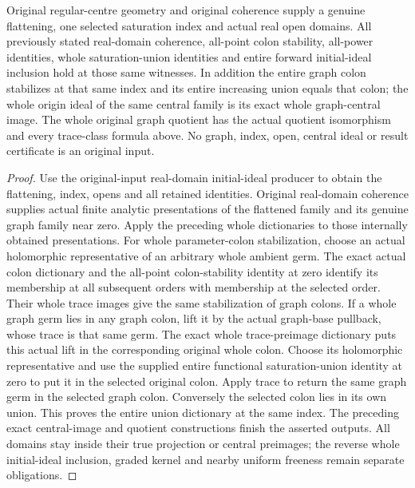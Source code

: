 \begin{theorem}
\label{hir:real-domain-original-whole-selected-graph-model}
\leanok
Original regular-centre geometry and original coherence supply a genuine
flattening, one selected saturation index and actual real open domains.
All previously stated real-domain coherence, all-point colon stability,
all-power identities, whole saturation-union identities and entire forward
initial-ideal inclusion hold at those same witnesses. In addition the
entire graph colon stabilizes at that same index and its entire increasing
union equals that colon; the whole origin ideal of the same central family
is its exact whole graph-central image. The whole original graph quotient
has the actual quotient isomorphism and every trace-class formula above.
No graph, index, open, central ideal or result certificate is an original
input.
\end{theorem}
\begin{proof}
Use the original-input real-domain initial-ideal producer to obtain the
flattening, index, opens and all retained identities. Original real-domain
coherence supplies actual finite analytic presentations of the flattened
family and its genuine graph family near zero. Apply the preceding whole
dictionaries to those internally obtained presentations. For whole
parameter-colon stabilization, choose an actual holomorphic representative
of an arbitrary whole ambient germ. The exact actual colon dictionary and
the all-point colon-stability identity at zero identify its membership at
all subsequent orders with membership at the selected order. Their whole
trace images give the same stabilization of graph colons. If a whole graph
germ lies in any graph colon, lift it by the actual graph-base pullback,
whose trace is that same germ. The exact whole trace-preimage dictionary
puts this actual lift in the corresponding original whole colon. Choose
its holomorphic representative and use the supplied entire functional
saturation-union identity at zero to put it in the selected original
colon. Apply trace to return the same graph germ in the selected graph
colon. Conversely the selected colon lies in its own union. This proves
the entire union dictionary at the same index. The preceding exact
central-image and quotient constructions finish the asserted outputs.
All domains stay inside their true projection or central preimages; the
reverse whole initial-ideal inclusion, graded kernel and nearby uniform
freeness remain separate obligations.
\end{proof}
